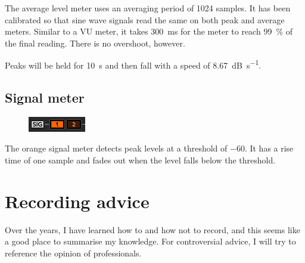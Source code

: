 The average level meter uses an averaging period of \num{1024}
samples.  It has been calibrated so that sine wave signals read the
same on both peak and average meters.  Similar to a VU meter, it takes
\SI{300}{\milli\second} for the meter to reach \SI{99}{\percent} of
the final reading.  There is no overshoot, however.

Peaks will be held for \SI{10}{\second} and then fall with a speed of
\SI{8.67}{\dB\per\second}.

\section{Signal meter}

\begin{figure}
  \includegraphics[scale=\screenshotscale,clip]{include/images/level_meter_signal.png}
\end{figure}

The orange signal meter detects peak levels at a threshold of
\SI{-60}{\dBFS}.  It has a rise time of one sample and fades out when
the level falls below the threshold.

\chapter{Recording advice}
\label{chap:recording_advice}

Over the years, I have learned how to and how not to record, and this
seems like a good place to summarise my knowledge.  For controversial
advice, I will try to reference the opinion of professionals.

